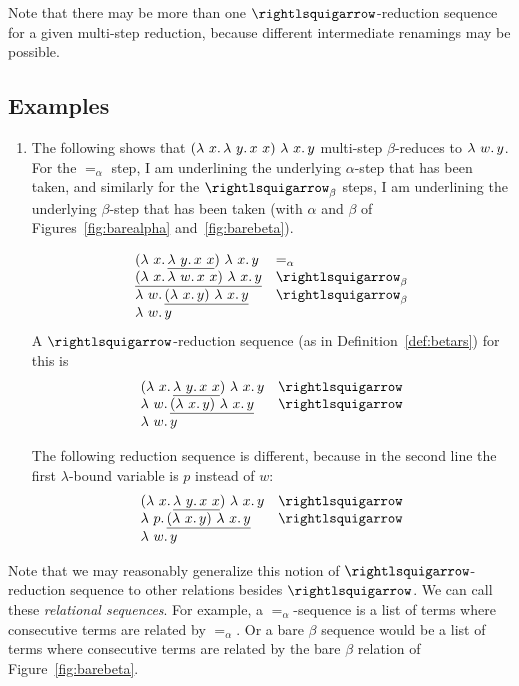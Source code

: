 Note that there may be more than one $\betaa$-reduction sequence
for a given multi-step reduction, because different intermediate
renamings may be possible.

\subsection{Examples}

\begin{enumerate}
\item The following shows that $(\lambda\ x.\, \lambda\ y.\, x\ x)\ \lambda\ x.\, y$
  multi-step $\beta$-reduces to $\lambda\ w.\, y$.  For the $=_\alpha$
  step, I am underlining the underlying $\alpha$-step that has been
  taken, and similarly for the $\betar$ steps, I am
  underlining the underlying $\beta$-step that has been taken (with
  $\alpha$ and $\beta$ of Figures~\ref{fig:barealpha} and~\ref{fig:barebeta}).

  \[
\begin{array}{ll}
  (\lam{x}{\underline{\lam{y}{x\ x}}})\ \lam{x}{y} & =_\alpha \\
  \underline{(\lam{x}{\lam{w}{x\ x}})\ \lam{x}{y}} & \betar \\
  \lam{w}{\underline{(\lam{x}{y})\ \lam{x}{y}}} & \betar \\
  \lam{w}{y} & \ 
\end{array}
\]
  A $\betaa$-reduction sequence (as in Definition~\ref{def:betars}) for this is
\[
\begin{array}{ll}
  (\lam{x}{\underline{\lam{y}{x\ x}}})\ \lam{x}{y} & \betaa \\
  \lam{w}{\underline{(\lam{x}{y})\ \lam{x}{y}}} & \betaa \\
  \lam{w}{y} & \
\end{array}
\]

The following reduction sequence is different, because in the second line the first
$\lambda$-bound variable is $p$ instead of $w$:
\[
\begin{array}{ll}
  (\lam{x}{\underline{\lam{y}{x\ x}}})\ \lam{x}{y} & \betaa \\
  \lam{p}{\underline{(\lam{x}{y})\ \lam{x}{y}}} & \betaa \\
  \lam{w}{y} & \
\end{array}
\]

\end{enumerate}

Note that we may reasonably generalize this notion of
$\betaa$-reduction sequence to other relations besides
$\betaa$.  We can call these \emph{relational sequences}.  For
example, a $=_\alpha$-sequence is a list of terms where consecutive
terms are related by $=_\alpha$. Or a bare $\beta$ sequence would
be a list of terms where consecutive terms are related by the bare $\beta$
relation of Figure~\ref{fig:barebeta}.


